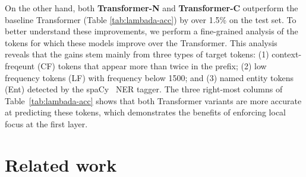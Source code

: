 \documentclass[11pt]{article}
\begin{document}
On the other hand, both \textbf{Transformer-N} and \textbf{Transformer-C} outperform the baseline Transformer (Table \ref{tab:lambada-acc}) by over 1.5\% on the test set. To better understand these improvements, we perform a fine-grained analysis of the tokens for which these models improve over the Transformer. This analysis reveals that the gains stem mainly from three types of target tokens: (1) context-freqeunt (CF) tokens that appear more than twice in the prefix; (2) low frequency tokens (LF) with frequency below 1500; and (3) named entity tokens (Ent) detected by the spaCy~\citep{spacy} NER tagger. The three right-most columns of Table~\ref{tab:lambada-acc} shows that both Transformer variants are more accurate at predicting these tokens, which demonstrates the benefits of enforcing local focus at the first layer.







\begin{table}[t]
    \centering
    \caption{NPLM and Transformer variants on LAMBADA target word accuracy (\%). 
    Variants perform better on context-frequent (CF) tokens that appear at least twice in previous context, low frequency (LF) tokens with frequency < 1500, and named entities (Ent). 
}
    \label{tab:lambada-acc}
\end{table}


 \section{Related work}
\end{document}
